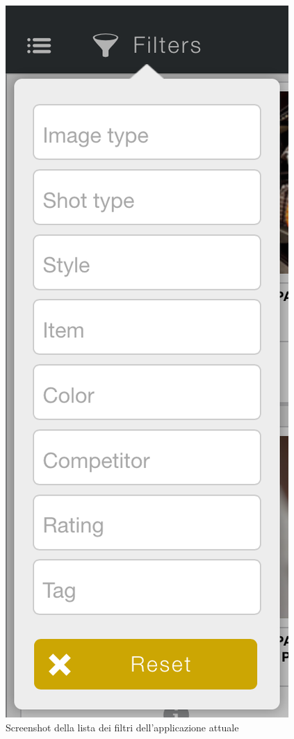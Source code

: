 \begin{figure}[htbp]
\centering
\includegraphics[scale=0.20]{../immagini/warda-filtri}
\caption{Screenshot della lista dei filtri dell'applicazione attuale}  
\end{figure}

